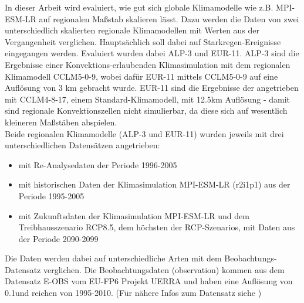In dieser Arbeit wird evaluiert, wie gut sich globale Klimamodelle wie z.B. MPI-ESM-LR auf regionalen Maßstab skalieren lässt. Dazu werden die Daten von zwei unterschiedlich skalierten regionale Klimamodellen mit Werten aus der Vergangenheit verglichen. Hauptsächlich soll dabei auf Starkregen-Ereignisse eingegangen werden. Evaluiert wurden dabei ALP-3 und EUR-11. ALP-3 sind  die Ergebnisse einer Konvektions-erlaubenden Klimasimulation mit dem regionalen Klimamodell CCLM5-0-9, wobei dafür EUR-11 mittels CCLM5-0-9 auf eine Auflösung von 3 km gebracht wurde. EUR-11 sind die Ergebnisse der angetrieben mit CCLM4-8-17, einem Standard-Klimamodell, mit 12.5km Auflösung - damit sind regionale Konvektionszellen nicht simulierbar, da diese sich auf wesentlich kleineren Maßstäben abspielen.\\
Beide regionalen Klimamodelle (ALP-3 und EUR-11) wurden jeweils mit drei unterschiedlichen Datensätzen angetrieben: 
\begin{itemize}
	\item mit Re-Analysedaten der Periode 1996-2005
	\item mit historischen Daten der Klimasimulation MPI-ESM-LR (r2i1p1) aus der Periode 1995-2005
	\item mit Zukunftsdaten der Klimasimulation MPI-ESM-LR und dem Treibhausszenario RCP8.5, dem höchsten der RCP-Szenarios, mit Daten aus der Periode 2090-2099
\end{itemize}
Die Daten werden dabei auf unterschiedliche Arten mit dem Beobachtungs-Datensatz verglichen. Die Beobachtungsdaten (observation) kommen aus dem Datensatz  E-OBS vom EU-FP6 Projekt UERRA und haben eine Auflösung von 0.1\degree und reichen von 1995-2010. (Für nähere Infos zum Datensatz siehe \cite{eobs})
